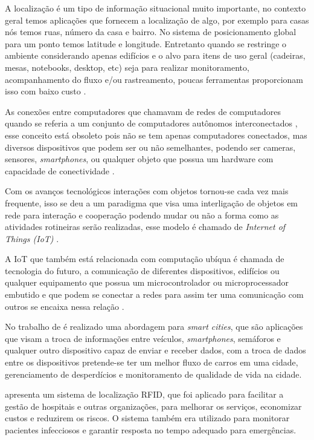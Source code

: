 

A localização é um tipo de informação situacional muito importante, no contexto geral temos aplicações que fornecem a
localização de algo, por exemplo para casas nós temos ruas, número da casa e bairro. No sistema de posicionamento global
para um ponto temos latitude e longitude. Entretanto quando se restringe o ambiente considerando apenas edifícios e o
alvo para itens de uso geral (cadeiras, mesas, notebooks, desktop, etc) seja para realizar monitoramento, acompanhamento do
fluxo e/ou rastreamento, poucas ferramentas proporcionam isso com baixo custo \cite{rfid2009review}.


As conexões entre computadores que chamavam de
redes de computadores quando se referia a um conjunto de computadores autônomos interconectados \cite{tenenbaum2002},
esse conceito está obsoleto pois não se tem apenas computadores conectados, mas diversos dispositivos que podem ser ou
não semelhantes, podendo ser cameras, sensores, \textit{smartphones}, ou qualquer objeto que possua um
hardware com capacidade de conectividade \cite{iot2016SBRC}.


Com os avanços tecnológicos interações com objetos tornou-se cada vez mais frequente, isso se deu a um paradigma
que visa uma interligação de objetos em rede para interação e cooperação podendo mudar ou não a forma como as atividades
rotineiras serão realizadas, esse modelo é chamado de \textit{Internet of Things (IoT)} \cite{realtimeRFID2016}.


A IoT que também está relacionada com computação ubíqua é chamada de tecnologia do futuro, a comunicação de diferentes dispositivos,
edifícios ou qualquer equipamento que possua um microcontrolador ou microprocessador embutido e que podem se conectar a
redes para assim ter uma comunicação com outros se encaixa nessa relação
\cite{mechanismRFID2006}.


No trabalho de  é realizado uma abordagem para \textit{smart cities}, que são
aplicações que visam a troca de informações entre veículos, \textit{smartphones}, semáforos e qualquer
outro dispositivo capaz de enviar e receber dados, com a troca de dados entre os dispositivos pretende-se
ter um melhor fluxo de carros em uma cidade, gerenciamento de desperdícios e monitoramento de qualidade de vida na cidade.


 apresenta um sistema de localização RFID, que foi aplicado para facilitar a gestão de
hospitais e outras organizações, para melhorar os serviços, economizar custos e reduzirem os riscos. O sistema também era
utilizado para monitorar pacientes infecciosos e garantir resposta no tempo adequado para emergências.


